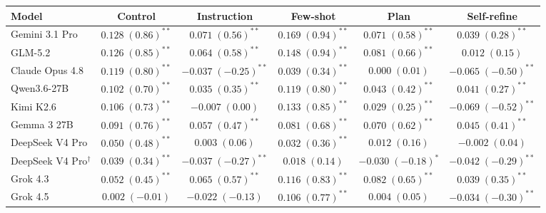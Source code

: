 \begin{tabular}{lccccc}
\toprule
Model & Control & Instruction & Few-shot & Plan & Self-refine \\
\midrule
Gemini 3.1 Pro & $0.128\;(0.86)^{**}$ & $0.071\;(0.56)^{**}$ & $0.169\;(0.94)^{**}$ & $0.071\;(0.58)^{**}$ & $0.039\;(0.28)^{**}$ \\
GLM-5.2 & $0.126\;(0.85)^{**}$ & $0.064\;(0.58)^{**}$ & $0.148\;(0.94)^{**}$ & $0.081\;(0.66)^{**}$ & $0.012\;(0.15)$ \\
Claude Opus 4.8 & $0.119\;(0.80)^{**}$ & $-0.037\;(-0.25)^{**}$ & $0.039\;(0.34)^{**}$ & $0.000\;(0.01)$ & $-0.065\;(-0.50)^{**}$ \\
Qwen3.6-27B & $0.102\;(0.70)^{**}$ & $0.035\;(0.35)^{**}$ & $0.119\;(0.80)^{**}$ & $0.043\;(0.42)^{**}$ & $0.041\;(0.27)^{**}$ \\
Kimi K2.6 & $0.106\;(0.73)^{**}$ & $-0.007\;(0.00)$ & $0.133\;(0.85)^{**}$ & $0.029\;(0.25)^{**}$ & $-0.069\;(-0.52)^{**}$ \\
Gemma 3 27B & $0.091\;(0.76)^{**}$ & $0.057\;(0.47)^{**}$ & $0.081\;(0.68)^{**}$ & $0.070\;(0.62)^{**}$ & $0.045\;(0.41)^{**}$ \\
DeepSeek V4 Pro & $0.050\;(0.48)^{**}$ & $0.003\;(0.06)$ & $0.032\;(0.36)^{**}$ & $0.012\;(0.16)$ & $-0.002\;(0.04)$ \\
DeepSeek V4 Pro$^{\dagger}$ & $0.039\;(0.34)^{**}$ & $-0.037\;(-0.27)^{**}$ & $0.018\;(0.14)$ & $-0.030\;(-0.18)^{*}$ & $-0.042\;(-0.29)^{**}$ \\
\midrule
Grok 4.3 & $0.052\;(0.45)^{**}$ & $0.065\;(0.57)^{**}$ & $0.116\;(0.83)^{**}$ & $0.082\;(0.65)^{**}$ & $0.039\;(0.35)^{**}$ \\
Grok 4.5 & $0.002\;(-0.01)$ & $-0.022\;(-0.13)$ & $0.106\;(0.77)^{**}$ & $0.004\;(0.05)$ & $-0.034\;(-0.30)^{**}$ \\
\bottomrule
\end{tabular}
